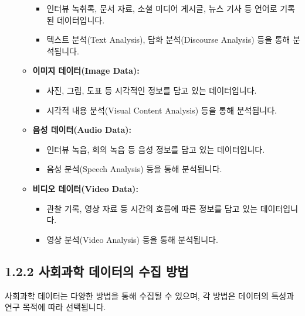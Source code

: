 \documentclass[
  letterpaper,
]{book}
\providecommand{\tightlist}{%
  \setlength{\itemsep}{0pt}\setlength{\parskip}{0pt}}
\begin{document}
\begin{itemize}
\begin{itemize}
    \begin{itemize}
    \tightlist
    \item
      인터뷰 녹취록, 문서 자료, 소셜 미디어 게시글, 뉴스 기사 등 언어로
      기록된 데이터입니다.
    \item
      텍스트 분석(Text Analysis), 담화 분석(Discourse Analysis) 등을
      통해 분석됩니다.
    \end{itemize}
  \item
    \textbf{이미지 데이터(Image Data):}

    \begin{itemize}
    \tightlist
    \item
      사진, 그림, 도표 등 시각적인 정보를 담고 있는 데이터입니다.
    \item
      시각적 내용 분석(Visual Content Analysis) 등을 통해 분석됩니다.
    \end{itemize}
  \item
    \textbf{음성 데이터(Audio Data):}

    \begin{itemize}
    \tightlist
    \item
      인터뷰 녹음, 회의 녹음 등 음성 정보를 담고 있는 데이터입니다.
    \item
      음성 분석(Speech Analysis) 등을 통해 분석됩니다.
    \end{itemize}
  \item
    \textbf{비디오 데이터(Video Data):}

    \begin{itemize}
    \tightlist
    \item
      관찰 기록, 영상 자료 등 시간의 흐름에 따른 정보를 담고 있는
      데이터입니다.
    \item
      영상 분석(Video Analysis) 등을 통해 분석됩니다.
    \end{itemize}
  \end{itemize}
\end{itemize}

\subsection{1.2.2 사회과학 데이터의 수집
방법}\label{uxc0acuxd68cuxacfcuxd559-uxb370uxc774uxd130uxc758-uxc218uxc9d1-uxbc29uxbc95}

사회과학 데이터는 다양한 방법을 통해 수집될 수 있으며, 각 방법은
데이터의 특성과 연구 목적에 따라 선택됩니다.
\end{document}

